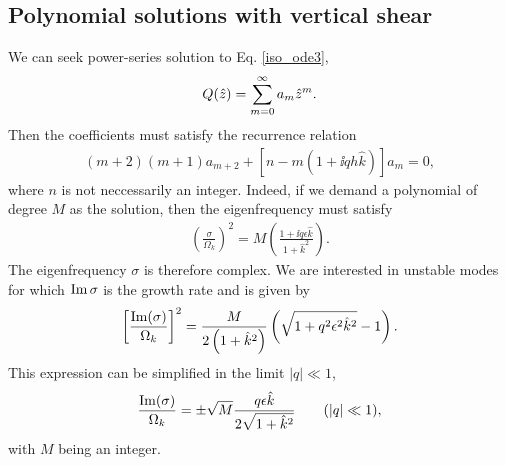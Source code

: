 \subsection{Polynomial solutions with vertical shear}
We can seek power-series solution to Eq. \ref{iso_ode3},
\begin{align}
  Q(\hat{z}) = \sum_{m=0}^\infty a_m\hat{z}^m. 
\end{align}
Then the coefficients must satisfy the recurrence relation
\begin{align}
  (m+2)(m+1)a_{m+2} +
  \left[n - m\left(1+\ii q h \hat{k}\right)\right] a_m = 0, 
\end{align}
where $n$ is not neccessarily an integer. Indeed, if we demand
a polynomial of degree $M$ as the solution, then the eigenfrequency
must satisfy
\begin{align}
\left(\frac{\sigma}{\Omega_k}\right)^2 = M\left(\frac{1+\ii q \epsilon
    \hat{k}}{1+\hat{k}^2}\right).
\end{align}
The eigenfrequency $\sigma$ is therefore complex. We are interested in
unstable modes for which $\operatorname{Im}{\sigma}$ is the growth rate and is
given by 
\begin{align}
   \left[\frac{\operatorname{Im}(\sigma)}{\Omega_k}\right]^2 =
   \frac{M}{2\left(1+\hat{k}^2\right)}\left(\sqrt{1+q^2\epsilon^2\hat{k}^2} - 
    1\right). 
\end{align}
This expression can be simplified in the limit $|q|\ll 1$, 
 \begin{align}\label{simple_growth}
   \frac{\operatorname{Im}(\sigma)}{\Omega_k} = \pm \sqrt{M} 
   \frac{q\epsilon\hat{k}}{2\sqrt{1+\hat{k}^2}} \quad\quad (|q|\ll 1), 
 \end{align}
 with $M$ being an integer. 

